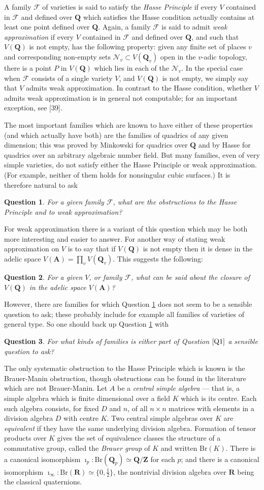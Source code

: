 \documentclass[12pt]{article}
\def\bA{{\mathbf A}}
\def\bQ{{\mathbf Q}}
\def\bR{{\mathbf R}}
\def\bZ{{\mathbf Z}}
\def\sF{{\mathcal F}}
\def\sN{{\mathcal N}}
\def\bpr{\begin{question} \label}
\def\epr{\end{question}}
\newtheorem{question}{Question}
\def\half{{\textstyle{\frac{1}{2}}}}
\begin{document}
A family $\sF$ of varieties is said to satisfy the \emph{Hasse Principle} if
every $V$ contained in $\sF$ and defined over $\bQ$
which satisfies the Hasse condition
actually contains at least one point defined over $\bQ$. Again, a family $\sF$
is said to admit \emph{weak approximation} if every $V$ contained in $\sF$
and defined over $\bQ$, and such that $V(\bQ)$ is not empty, has the following
property: given any finite set of places $v$ and corresponding non-empty sets
$\sN_v\subset V(\bQ_v)$ open in the $v$-adic topology, there is a point $P$
in $V(\bQ)$ which lies in each
of the $\sN_v$. In the special case when $\sF$ consists of a single variety
$V$, and $V(\bQ)$ is not empty, we simply say that $V$ admits weak
approximation. In contrast to the Hasse condition, whether $V$ admits
weak approximation is in general not computable; for an important exception,
see [39].

The most important families which are known to have either of these properties
(and which actually have both) are the families of quadrics of any given
dimension; this was
proved by Minkowski for quadrics over $\bQ$ and by Hasse for quadrics
over an arbitrary algebraic
number field. But many families, even of very simple varieties, do not
satisfy either the Hasse Principle or weak approximation. (For example, neither
of them holds for nonsingular
cubic surfaces.) It is therefore natural to ask
\bpr{Q1} For a given family $\sF$, what are the obstructions to the Hasse
Principle and to weak approximation?
\epr
For weak approximation there is a variant of this question which may be both
more interesting and easier to answer. For another way of stating weak
approximation on $V$ is to say that if $V(\bQ)$ is not empty then it is dense
in the adelic space $V(\bA)=\prod_vV(\bQ_v)$. This suggests the following:
\bpr{Q19} For a given $V$, or family $\sF$, what can be said about the closure
of $V(\bQ)$ in the adelic space $V(\bA)$?
\epr
However, there are families for which Question \ref{Q1} does not seem to be a
sensible
question to ask; these probably include for example all families of
varieties of general type. So one should back up Question \ref{Q1} with
\bpr{Q2} For what kinds of families is either part of Question $\ref{Q1}$ a
sensible question to ask?
\epr

The only systematic obstruction to the Hasse Principle which is known is the
Brauer-Manin obstruction, though obstructions can be found in the literature
which are not Brauer-Manin. Let $A$ be a \emph{central simple algebra} ---
that is, a simple algebra which is finite dimensional over a field $K$ which
is its centre. Each such algebra consists, for fixed $D$ and $n$, of all
$n\times n$ matrices with elements in a division algebra $D$ with centre $K$.
Two
central simple algebras over $K$ are \emph{equivalent} if they have the same
underlying division algebra. Formation of tensor products over $K$ gives the
set of equivalence classes the structure of a commutative group, called the
\emph{Brauer group} of $K$ and written Br$(K)$. There is a
canonical isomorphism $\imath_p:{\mathrm{Br}}(\bQ_p)\simeq\bQ/\bZ$ for each
$p$; and there
is a canonical isomorphism $\imath_\infty:{\mathrm{Br}}(\bR)\simeq\{0,\half\}$,
the nontrivial division algebra over $\bR$ being the classical quaternions.
\end{document}
